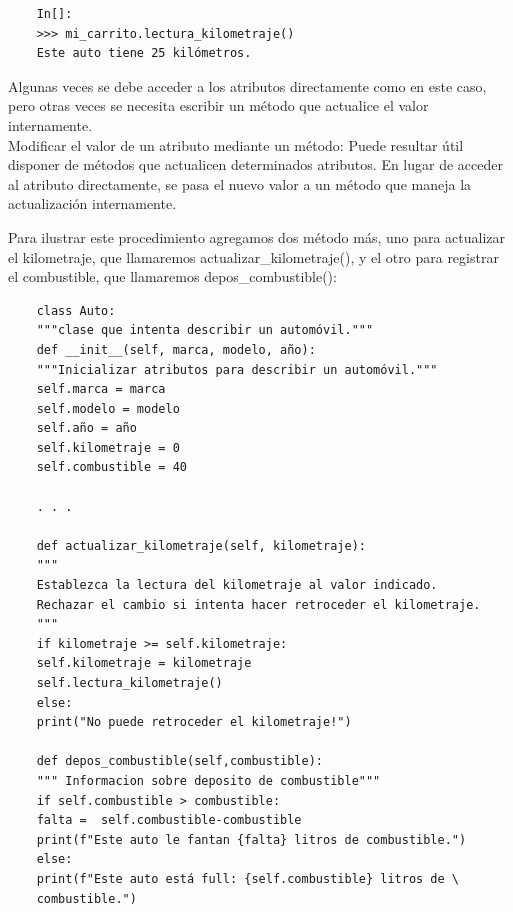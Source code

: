 {\begin{lstlisting}
	In[]:
	>>> mi_carrito.lectura_kilometraje()
	Este auto tiene 25 kilómetros.			
\end{lstlisting}

Algunas veces se debe acceder a los atributos directamente como en este caso, pero otras veces se necesita escribir un método que actualice el valor internamente.\\

Modificar el valor de un atributo mediante un método: Puede resultar útil disponer de métodos que actualicen determinados atributos. En lugar de acceder al atributo directamente, se pasa el nuevo valor a un método que maneja la actualización internamente.

Para ilustrar este procedimiento agregamos dos método más, uno para actualizar el kilometraje,  
que llamaremos {\ttfamily actualizar\_kilometraje()}, y el otro para registrar el combustible, que llamaremos 
{\ttfamily depos\_combustible()}:


\hspace{-2.0cm}{\ttfamily \scriptsize auto.py}\vspace{-0.5cm}
\begin{lstlisting}
	class Auto:
	"""clase que intenta describir un automóvil."""
	def __init__(self, marca, modelo, año):
	"""Inicializar atributos para describir un automóvil."""
	self.marca = marca
	self.modelo = modelo
	self.año = año
	self.kilometraje = 0
	self.combustible = 40
	
	. . .
	
	def actualizar_kilometraje(self, kilometraje):
	"""
	Establezca la lectura del kilometraje al valor indicado.
	Rechazar el cambio si intenta hacer retroceder el kilometraje.
	"""
	if kilometraje >= self.kilometraje:
	self.kilometraje = kilometraje
	self.lectura_kilometraje()
	else:
	print("No puede retroceder el kilometraje!")
	
	def depos_combustible(self,combustible):
	""" Informacion sobre deposito de combustible"""
	if self.combustible > combustible:
	falta =  self.combustible-combustible
	print(f"Este auto le fantan {falta} litros de combustible.")
	else:
	print(f"Este auto está full: {self.combustible} litros de \
	combustible.")        
\end{lstlisting}



}
